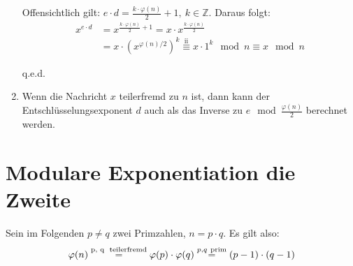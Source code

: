 \documentclass[DIN, pagenumber=false, fontsize=11pt, parskip=half]{scrartcl}
\newcommand{\Z}[0]{\mathbb{Z}}
\newcommand{\congTo}[3][]{\stackrel{#1}{\equiv} #2\mod #3}
\newcommand{\Qed}{\begin{flushright}
    q.e.d.
\end{flushright}}
\begin{document}
\begin{enumerate}[label=(\roman*)]
              Offensichtlich gilt: $e \cdot d = \frac{k \cdot \varphi(n)}{2} + 1, \ k \in \Z$. Daraus folgt:
              \begin{align}
                  x^{e \cdot d} &= x^{\frac{k \cdot \varphi(n)}{2} + 1} = x \cdot x^{\frac{k \cdot \varphi(n)}{2}} \\
                   &= x \cdot \left(x^{\varphi(n)/2}\right)^k \congTo[\text{ii}]{x \cdot 1^k}{n} \congTo{x}{n}
              \end{align}
              \Qed
        \item Wenn die Nachricht $x$ teilerfremd zu $n$ ist, dann kann der Entschlüsselungsexponent $d$ auch als das Inverse zu $e \mod \frac{\varphi(n)}{2}$
              berechnet werden.
    \end{enumerate}
    \section{Modulare Exponentiation die Zweite}
    Sein  im Folgenden $p \neq q$ zwei Primzahlen, $n = p \cdot q$. Es gilt also:
    \begin{equation}
        \varphi(n) \stackrel{\text{p, q \ \text{teilerfremd}}}{=} \varphi(p) \cdot \varphi(q) \stackrel{p, q \ \text{prim}}{=} (p - 1) \cdot (q - 1)
        \label{eq:phi}
    \end{equation}
\end{document}
